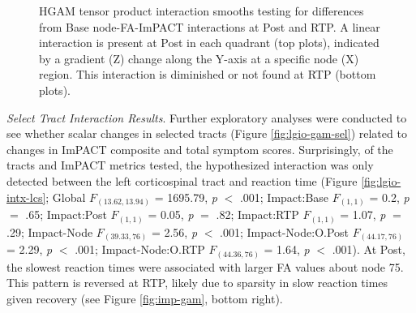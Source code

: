 \documentclass[12pt]{article}
\begin{document}

\begin{figure}[H]
	\centering
	\caption{HGAM tensor product interaction smooths testing for differences from Base node-FA-ImPACT interactions at Post and RTP. A linear interaction is present at Post in each quadrant (top plots), indicated by a gradient (Z) change along the Y-axis at a specific node (X) region. This interaction is diminished or not found at RTP (bottom plots).}
	\label{fig:lgio-intx-cc}
\end{figure}


\textit{Select Tract Interaction Results}. Further exploratory analyses were conducted to see whether scalar changes in selected tracts (Figure \ref{fig:lgio-gam-sel}) related to changes in ImPACT composite and total symptom scores. Surprisingly, of the tracts and ImPACT metrics tested, the hypothesized interaction was only detected between the left corticospinal tract and reaction time (Figure \ref{fig:lgio-intx-lcs}; Global $F_{(13.62, 13.94)}$ = 1695.79, \textit{p} $<$ .001; Impact:Base $F_{(1, 1)}$ = 0.2, \textit{p} $=$ .65; Impact:Post $F_{(1, 1)}$ = 0.05, \textit{p} $=$ .82; Impact:RTP $F_{(1, 1)}$ = 1.07, \textit{p} $=$ .29; Impact-Node $F_{(39.33, 76)}$ = 2.56, \textit{p} $<$ .001; Impact-Node:O.Post $F_{(44.17, 76)}$ = 2.29, \textit{p} $<$ .001; Impact-Node:O.RTP $F_{(44.36, 76)}$ = 1.64, \textit{p} $<$ .001). At Post, the slowest reaction times were associated with larger FA values about node 75. This pattern is reversed at RTP, likely due to sparsity in slow reaction times given recovery (see Figure \ref{fig:imp-gam}, bottom right).
\end{document}
